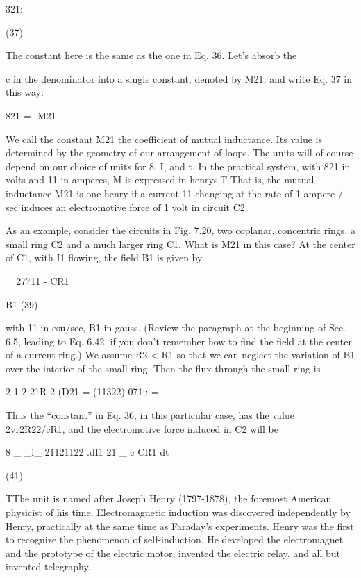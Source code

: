 321: -

(37)

The constant here is the same as the one in Eq. 36. Let's absorb the

c in the denominator into a single constant, denoted by M21, and write
Eq. 37 in this way:

\begin{equation}
\end{equation}
821 = -M21%

We call the constant M21 the coefficient of mutual inductance. Its
value is determined by the geometry of our arrangement of loops.
The units will of course depend on our choice of units for 8, I, and t.
In the practical system, with 821 in volts and 11 in amperes, M is expressed
in henrys.T That is, the mutual inductance M21 is one henry
if a current 11 changing at the rate of 1 ampere / sec induces an electromotive
force of 1 volt in circuit C2.

As an example, consider the circuits in Fig. 7.20, two coplanar,
concentric rings, a small ring C2 and a much larger ring C1. What
is M21 in this case? At the center of C1, with I1 flowing, the field B1
is given by

\begin{equation}
\end{equation}
_ 27711
- CR1

B1 (39)

with 11 in esu/sec, B1 in gauss. (Review the paragraph at the beginning
of Sec. 6.5, leading to Eq. 6.42, if you don't remember how to
find the field at the center of a current ring.) We assume R2 < R1
so that we can neglect the variation of B1 over the interior of the small
ring. Then the flux through the small ring is

\begin{equation}
\end{equation}
2 1 2 21R 2
(D21 = (11322) 071;: = %

Thus the ``constant'' in Eq. 36, in this particular case, has the value
2vr2R22/cR1, and the electromotive force induced in C2 will be

\begin{equation}
\end{equation}
8 _ _i_ 21121122 .dI1
21 _ c CR1 dt

(41)

TThe unit is named after Joseph Henry (1797-1878), the foremost American physicist
of his time. Electromagnetic induction was discovered independently by Henry, practically
at the same time as Faraday's experiments. Henry was the first to recognize the
phenomenon of self-induction. He developed the electromagnet and the prototype of
the electric motor, invented the electric relay, and all but invented telegraphy.


